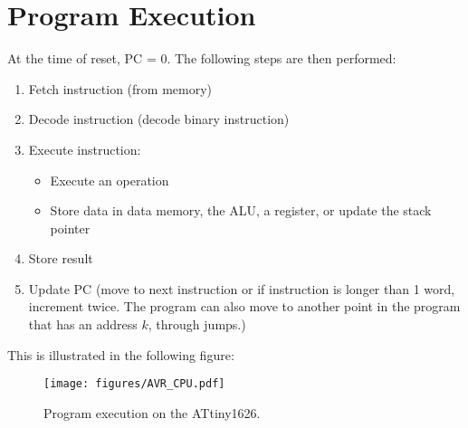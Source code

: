 \documentclass[a4paper]{report}
\begin{document}
\section{Program Execution}
At the time of reset, PC = 0. The following steps are then performed:
\begin{enumerate}
    \item Fetch instruction (from memory)
    \item Decode instruction (decode binary instruction)
    \item Execute instruction:
          \begin{itemize}
              \item Execute an operation
              \item Store data in data memory, the ALU, a register, or
                    update the stack pointer
          \end{itemize}
    \item Store result
    \item Update PC (move to next instruction or if instruction is
          longer than 1 word, increment twice. The program can also
          move to another point in the program that has an address
          \(k\), through jumps.)
\end{enumerate}
This is illustrated in the following figure:
\begin{figure}[H]
    \centering
    \texttt{[image: figures/AVR\_CPU.pdf]}
    \caption{Program execution on the ATtiny1626.} %
\end{figure}
\end{document}
